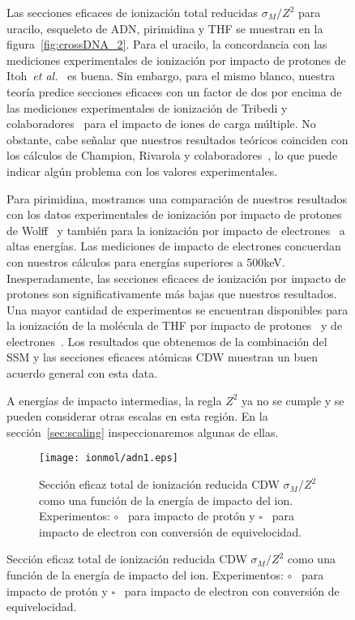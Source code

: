 \begin{figure}
Las secciones eficaces de ionización total reducidas $\sigma_M/Z^2$ 
para uracilo, esqueleto de ADN, pirimidina y THF se muestran en la 
figura~\ref{fig:crossDNA_2}. Para el uracilo, la concordancia con las 
mediciones experimentales de ionización por impacto de protones de 
Itoh~\textit{et al.}~\cite{itoh2013} es buena. Sin embargo, para el 
mismo blanco, nuestra teoría predice secciones eficaces con un factor 
de dos por encima de las mediciones experimentales de ionización de 
Tribedi y colaboradores~\cite{agnihotri2012,agnihotri2013} para el 
impacto de iones de carga múltiple. No obstante, cabe señalar que 
nuestros resultados teóricos coinciden con los cálculos de Champion, 
Rivarola y colaboradores~\cite{agnihotri2012,champion2012}, lo que 
puede indicar algún problema con los valores experimentales.


Para pirimidina, mostramos una comparación de nuestros resultados con 
los datos experimentales de ionización por impacto de protones de 
Wolff~\cite{wolff2014} y también para la ionización por impacto de 
electrones~\cite{bug2017} a altas energías. Las mediciones de impacto 
de electrones concuerdan con nuestros cálculos para energías superiores 
a 500keV. Inesperadamente, las secciones eficaces de ionización por 
impacto de protones son significativamente más bajas que nuestros 
resultados. Una mayor cantidad de experimentos se encuentran disponibles 
para la ionización de la molécula de THF por impacto de 
protones~\cite{wang2016} y de electrones~\cite{bug2017,wolf2019,fuss2009}. 
Los resultados que obtenemos de la combinación del SSM y las secciones
eficaces atómicas CDW muestran un buen acuerdo general con esta data.

A energías de impacto intermedias, la regla $Z^2$ ya no se cumple y se 
pueden considerar otras escalas en esta región. En la 
sección~\ref{sec:scaling} inspeccionaremos algunas de ellas.



\begin{figure}
\centering
\texttt{[image: ionmol/adn1.eps]}
\caption[Sección eficaz total de ionización reducida de moléculas (parte 1).]
{Sección eficaz total de ionización reducida CDW $\sigma_{M}/Z^2$ como una 
función de la energía de impacto del ion. Experimentos: 
\mbox{\Large$\circ$}~\cite{iriki2011} para impacto de protón y
$\square$~\cite{rahman2016} para impacto de electron con conversión de
equivelocidad.}
\label{fig:crossDNA_1}
\end{figure} 


\end{figure}
